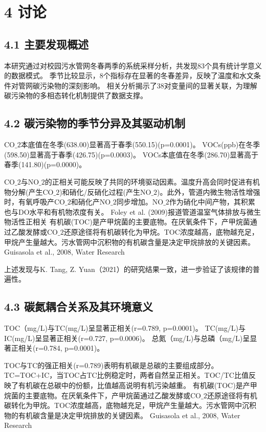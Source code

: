 \section{4 讨论}

\subsection{4.1 主要发现概述}

本研究通过对校园污水管网冬春两季的系统采样分析，共发现83个具有统计学意义的数据模式。
季节比较显示，8个指标存在显著的冬春差异，反映了温度和水文条件对管网碳污染物的深刻影响。
相关分析揭示了38对变量间的显著关联，为理解碳污染物的多相态转化机制提供了数据支撑。

\subsection{4.2 碳污染物的季节分异及其驱动机制}

CO$\_2$本底值在冬季(638.00)显著高于春季(550.15)(p=0.0001)。
VOCs(ppb)在冬季(598.50)显著高于春季(426.75)(p=0.0003)。
VOCs本底值在冬季(286.70)显著高于春季(141.80)(p=0.0000)。

CO$\_2$与NO$\_2$的正相关可能反映了共同的环境驱动因素。温度升高会同时促进有机物分解(产生CO$\_2$)和硝化/反硝化过程(产生NO$\_2$)。此外，管道内微生物活性增强时，有氧呼吸产CO$\_2$和硝化产NO$\_2$同步增加。NO$\_2$作为硝化中间产物，其积累也与DO水平和有机物浓度有关。
Foley et al. (2009)报道管道温室气体排放与微生物活性正相关
有机碳(TOC)是产甲烷菌的主要底物。在厌氧条件下，产甲烷菌通过乙酸发酵或CO$\_2$还原途径将有机碳转化为甲烷。TOC浓度越高，底物越充足，甲烷产生量越大。污水管网中沉积物的有机碳含量是决定甲烷排放的关键因素。
Guisasola et al., 2008, Water Research

上述发现与K. Tang, Z. Yuan（2021）的研究结果一致，进一步验证了该规律的普遍性。

\subsection{4.3 碳氮耦合关系及其环境意义}

TOC（mg/L)与TC(mg/L)呈显著正相关(r=0.789, p=0.0001)。
TC(mg/L)与IC(mg/L)呈显著正相关(r=0.727, p=0.0006)。
总氮（mg/L)与总磷（mg/L)呈显著正相关(r=0.784, p=0.0001)。

TOC与TC的强正相关(r=0.789)表明有机碳是总碳的主要组成部分。TC=TOC+IC，当TOC占TC比例稳定时，两者自然呈正相关。TOC/TC比值反映了有机碳在总碳中的份额，比值越高说明有机污染越重。
有机碳(TOC)是产甲烷菌的主要底物。在厌氧条件下，产甲烷菌通过乙酸发酵或CO$\_2$还原途径将有机碳转化为甲烷。TOC浓度越高，底物越充足，甲烷产生量越大。污水管网中沉积物的有机碳含量是决定甲烷排放的关键因素。
Guisasola et al., 2008, Water Research

